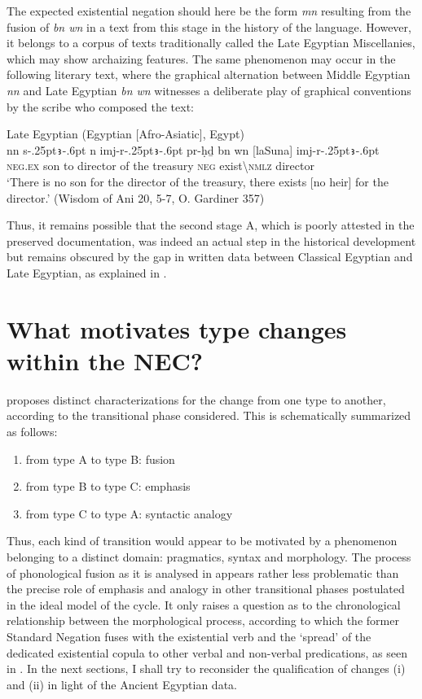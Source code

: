 \documentclass[output=paper]{langsci/langscibook}
\newcommand{\ꜥ}{ʿ}
\newcommand{\ꜣ}{\kern-.25pt\texttt{ꜣ}\kern-.6pt}
\begin{document}
The expected existential negation should here be the form \textit{mn} resulting from the fusion of \textit{bn wn} in a text from this stage in the history of the language. However, it belongs to a corpus of texts traditionally called the Late Egyptian Miscellanies, which may show archaizing features. The same phenomenon may occur in the following literary text, where the graphical alternation between Middle Egyptian \textit{nn} and Late Egyptian \textit{bn wn} witnesses a deliberate play of graphical conventions by the scribe who composed the text:  
 
\ea Late Egyptian (Egyptian [Afro-Asiatic], Egypt) \label{ex:AE52}\\
    \gll nn s{\ꜣ} n imj-r{\ꜣ} pr-ḥḏ bn wn [laSuna] imj-r{\ꜣ}\\
    \textsc{neg.ex} son to director of the treasury \textsc{neg} exist\textbackslash\textsc{nmlz} director\\ 
    \glt ‘There is no son for the director of the treasury, there exists [no heir] for the director.’ (Wisdom of Ani 20, 5-7, O. Gardiner 357) 
\z 

Thus, it remains possible that the second stage A, which is poorly attested in the preserved documentation, was indeed an actual step in the historical development but remains obscured by the gap in written data between Classical Egyptian and Late Egyptian, as explained in .

\section{What motivates type changes within the NEC?}\label{s:AE4}

\citet{Croft1991} proposes distinct characterizations for the change from one type to another, according to the transitional phase considered. This is schematically summarized as follows: 

\begin{enumerate}[label=(\roman*)]
    \item from type A to type B: fusion 
    \item from type B to type C: emphasis 
    \item from type C to type A: syntactic analogy 
\end{enumerate}

Thus, each kind of transition would appear to be motivated by a phenomenon belonging to a distinct domain: pragmatics, syntax and morphology. The process of phonological fusion as it is analysed in \citet{Croft1991} appears rather less problematic than the precise role of emphasis and analogy in other transitional phases postulated in the ideal model of the cycle. It only raises a question as to the chronological relationship between the morphological process, according to which the former Standard Negation fuses with the existential verb and the ‘spread’ of the dedicated existential copula to other verbal and non-verbal predications, as seen in . In the next sections, I shall try to reconsider the qualification of changes (i) and (ii) in light of the Ancient Egyptian data.
\end{document}
